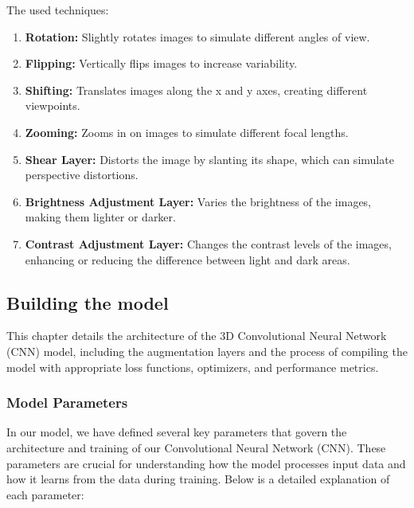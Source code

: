 The used techniques:
\begin{enumerate}
    \item \textbf{Rotation:} Slightly rotates images to simulate different angles of view.
    \item \textbf{Flipping:} Vertically flips images to increase variability.
    \item \textbf{Shifting:} Translates images along the x and y axes, creating different viewpoints.
    \item \textbf{Zooming:} Zooms in on images to simulate different focal lengths.
    \item \textbf{Shear Layer:} Distorts the image by slanting its shape, which can simulate perspective distortions.
    \item \textbf{Brightness Adjustment Layer:} Varies the brightness of the images, making them lighter or darker. 
    \item \textbf{Contrast Adjustment Layer:} Changes the contrast levels of the images, enhancing or reducing the difference between light and dark areas.
\end{enumerate}

\subsection{Building the model}

This chapter details the architecture of the 3D Convolutional Neural Network (CNN) model, including the augmentation layers and the process of compiling the model with appropriate loss functions, optimizers, and performance metrics.

\subsubsection{Model Parameters}

In our model, we have defined several key parameters that govern the architecture and training of our Convolutional Neural Network (CNN). These parameters are crucial for understanding how the model processes input data and how it learns from the data during training. Below is a detailed explanation of each parameter:

